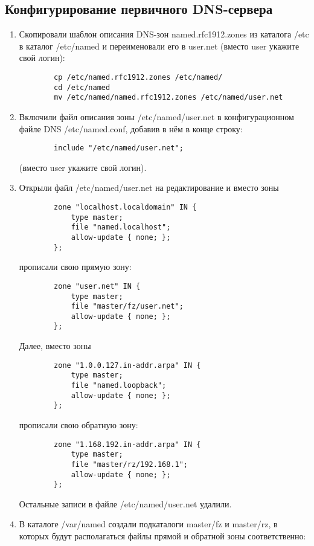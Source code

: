 \subsection{Конфигурирование первичного DNS-сервера}
\begin{enumerate}
     \item Скопировали шаблон описания DNS-зон named.rfc1912.zones из каталога /etc в каталог /etc/named и переименовали его в user.net (вместо user укажите свой логин):
        \begin{verbatim}
        cp /etc/named.rfc1912.zones /etc/named/
        cd /etc/named
        mv /etc/named/named.rfc1912.zones /etc/named/user.net
        \end{verbatim}
    \item Включили файл описания зоны /etc/named/user.net в конфигурационном файле DNS /etc/named.conf, добавив в нём в конце строку:
        \begin{verbatim}
        include "/etc/named/user.net";
        \end{verbatim}
(вместо user укажите свой логин).
    \item Открыли файл /etc/named/user.net на редактирование и вместо зоны
        \begin{verbatim}
        zone "localhost.localdomain" IN {
            type master;
            file "named.localhost";
            allow-update { none; };
        };
        \end{verbatim}
    прописали свою прямую зону:
        \begin{verbatim}
        zone "user.net" IN {
            type master;
            file "master/fz/user.net";
            allow-update { none; };
        };
        \end{verbatim}
    Далее, вместо зоны
        \begin{verbatim}
        zone "1.0.0.127.in-addr.arpa" IN {
            type master;
            file "named.loopback";
            allow-update { none; };
        };
        \end{verbatim}
    прописали свою обратную зону:
        \begin{verbatim}
        zone "1.168.192.in-addr.arpa" IN {
            type master;
            file "master/rz/192.168.1";
            allow-update { none; };
        };
        \end{verbatim}
    Остальные записи в файле /etc/named/user.net удалили.
    \item В каталоге /var/named создали подкаталоги master/fz и master/rz, в которых будут располагаться файлы прямой и обратной зоны соответственно:

\end{enumerate}

